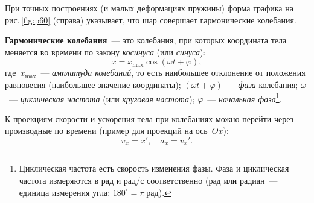 \documentclass[main.tex]{subfiles}
\begin{document}
При точных построениях 
(и малых деформациях пружины)  
форма графика на рис.\,\ref{fig:p60} (справа) указывает, что шар совершает гармонические колебания.

\textbf{Гармонические колебания}~--- это колебания, при которых координата тела меняется во времени по закону \emph{косинуса} (или \emph{синуса}):
\begin{equation}
    x=x_\text{max}\cos(\omega t+\varphi),
\end{equation}
где~$x_\text{max}$~--- \emph{амплитуда колебаний}, то есть наибольшее отклонение от положения равновесия (наибольшее значение координаты); $(\omega t+\varphi)$~--- \emph{фаза} колебания; $\omega$~--- \emph{циклическая частота} (или \emph{круговая частота}); $\varphi$~--- \emph{начальная фаза}\footnote{Циклическая частота есть скорость изменения фазы. Фаза и циклическая частота измеряются в рад и рад$/$с соответственно (рад или радиан~--- единица измерения угла: $180^\circ=\pi~\text{рад}$).}.

К проекциям скорости и ускорения тела при колебаниях можно перейти через производные по времени (пример для проекций на ось~$Ox$): 
\begin{equation}
    v_x=x',\quad a_x=v_x'.
\end{equation}










 
\end{document}
